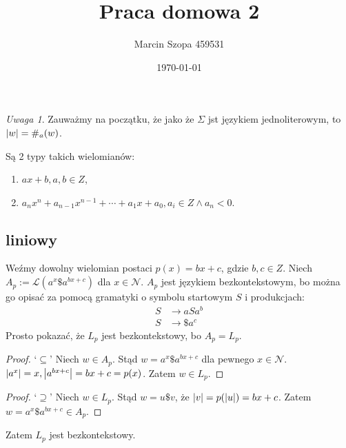 \documentclass{article}
\title{Praca domowa 2}
\author{Marcin Szopa 459531}
\date{\today}
\theoremstyle{definition}
\theoremstyle{remark}
\newtheorem*{remark}{Uwaga}
\begin{document}
\maketitle

\section{}\label{sec:a}

\begin{remark}
    Zauważmy na początku, że jako że \(\Sigma\) jst językiem jednoliterowym, to
    \(\abs{w} = \#_a(w)\).
\end{remark}

Są 2 typy takich wielomianów:

\begin{enumerate}
    \item \(ax + b, a,b \in Z\),
    \item \(a_nx^n + a_{n-1}x^{n-1} + \cdots + a_1x + a_0, a_i \in Z \land a_n < 0\).
\end{enumerate}

\subsection{liniowy}

Weźmy dowolny wielomian postaci \( p(x)=bx + c\), gdzie \(b,c \in Z\). 
Niech \(A_p := \mathcal{L}(a^x \$ a^{bx + c})\) dla \(x \in \mathcal{N}\).
\(A_p\) jest językiem bezkontekstowym, bo można go opisać za pomocą gramatyki
o symbolu startowym \(S\) i produkcjach:
\begin{align*}
    S &\to a S a^b  \\
    S &\to \$ a^c
\end{align*}
Prosto pokazać, że \(L_p\) jest bezkontekstowy, bo \(A_p = L_p\).

\begin{proof}
    `\(\subseteq\)'
    Niech \(w \in A_p\). Stąd \(w = a^x \$ a^{bx + c}\) dla pewnego \(x \in \mathcal{N}\).
    \( \abs{a^x}=x, \abs{a^{bx + c}}=bx + c = p(x)\). Zatem \(w \in L_p\).
\end{proof}

\begin{proof}
    `\(\supseteq\)'
    Niech \(w \in L_p\). Stąd \(w = u \$ v\), że \( \abs{v} = p(\abs{u})
    = bx+c\). Zatem \(w = a^x \$ a^{bx + c} \in A_p\).
\end{proof}

Zatem \(L_p\) jest bezkontekstowy.
\end{document}
